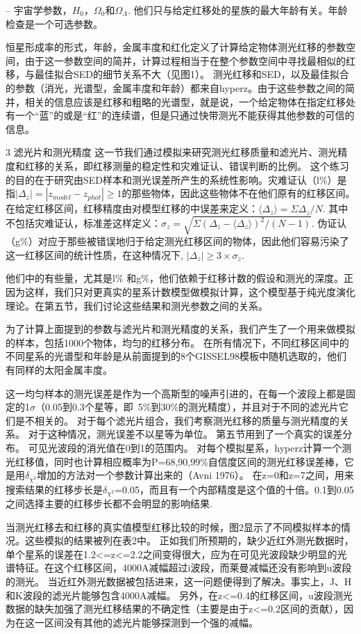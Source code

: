 -- 宇宙学参数，$H_0$，$\Omega_0$和$\Omega_\Lambda$.
他们只与给定红移处的星族的最大年龄有关。年龄检查是一个可选参数。
 
恒星形成率的形式，年龄，金属丰度和红化定义了计算给定物体测光红移的参数空间，由于这一参数空间的简并，计算过程相当于在整个参数空间中寻找最相似的红移，与最佳拟合SED的细节关系不大（见图1）。
测光红移和SED，以及最佳拟合的参数（消光，光谱型，金属丰度和年龄）都来自hyperz。由于这些参数之间的简并，相关的信息应该是红移和粗略的光谱型，就是说，一个给定物体在指定红移处有一个“蓝”的或是“红”的连续谱，但是只通过快带测光不能获得其他参数的可信的信息。
 
3 滤光片和测光精度
这一节我们通过模拟来研究测光红移质量和滤光片、测光精度和红移的关系，即红移测量的稳定性和灾难证认、错误判断的比例。
这个练习的目的在于研究由SED样本和测光误差所产生的系统性影响。灾难证认（l\%）是指$|\Delta_z|=|z_{model}-z_{phot}|\geq1$的那些物体，因此这些物体不在他们原有的红移区间。
在给定红移区间，红移精度由对模型红移的中误差来定义：$\langle\Delta_z\rangle=\Sigma\Delta_z/N$.
其中不包括灾难证认，标准差这样定义：$\sigma_z=\sqrt{\Sigma(\Delta_z-\langle\Delta_z\rangle)^2/(N-1)}$.
伪证认（g\%）对应于那些被错误地归于给定测光红移区间的物体，因此他们容易污染了这一红移区间的统计性质，在这种情况下,
$|\Delta_z|\geq3\times\sigma_z$.
 
他们中的有些量，尤其是l\% 和g\%，他们依赖于红移计数的假设和测光的深度。正因为这样，我们只对更真实的星系计数模型做模拟计算，这个模型基于纯光度演化理论。在第五节，我们讨论这些结果和测光参数之间的关系。
 
为了计算上面提到的参数与滤光片和测光精度的关系，我们产生了一个用来做模拟的样本，包括1000个物体，均匀的红移分布。
在所有情况下，不同红移区间中的不同星系的光谱型和年龄是从前面提到的8个GISSEL98模板中随机选取的，他们有同样的太阳金属丰度。
 
这一均匀样本的测光误差是作为一个高斯型的噪声引进的，在每一个波段上都是固定的1$\sigma$（0.05到0.3个星等，即~5\%到30\%的测光精度），并且对于不同的滤光片它们是不相关的。
对于每个滤光片组合，我们考察测光红移的质量与测光精度的关系。
对于这种情况，测光误差不以星等为单位。
第五节用到了一个真实的误差分布。
可见光波段的消光值在0到1的范围内。
对每个模拟星系，hyperz计算一个测光红移值，同时也计算相应概率为P=68,90,99\%自信度区间的测光红移误差棒，它是用$\delta_{\chi^2}$增加的方法对一个参数计算出来的（Avni 1976）。
在z=0和z=7之间，用来搜索结果的红移步长是$\delta_{\chi^2}$=0.05，而且有一个内部精度是这个值的十倍。0.1到0.05之间选择主要的红移步长都不会明显的影响结果.
 
当测光红移去和红移的真实值模型红移比较的时候，图2显示了不同模拟样本的情况。这些模拟的结果被列在表2中。
正如我们所预期的，缺少近红外测光数据时，单个星系的误差在1.2<=z<=2.2之间变得很大，应为在可见光波段缺少明显的光谱特征。在这个红移区间，4000A减幅超过i波段，而莱曼减幅还没有影响到u波段的测光。
当近红外测光数据被包括进来，这一问题便得到了解决。事实上，J、H和K波段的滤光片能够包含4000A减幅。
另外，在z<=0.4的红移区间，u波段测光数据的缺失加强了测光红移结果的不确定性（主要是由于z<=0.2区间的贡献），因为在这一区间没有其他的滤光片能够探测到一个强的减幅。
 
